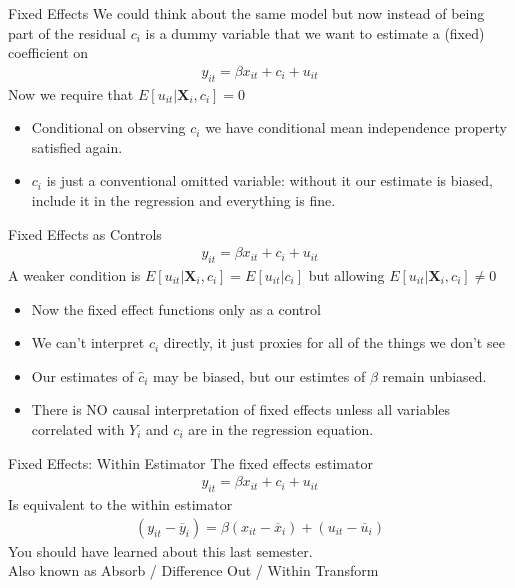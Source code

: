 \begin{frame}{Fixed Effects}
We could think about the same model but now instead of being part of the \alert{residual} $c_i$ is a dummy variable that we want to estimate a (fixed) coefficient on
\begin{align*}
y_{it} = \beta x_{it} + c_i + u_{it}
\end{align*}
Now we require that $E[u_{it}| \mathbf{X}_i , c_i] = 0$
\begin{itemize}
    \item Conditional on observing $c_i$ we have conditional mean independence property satisfied again.
    \item $c_i$ is just a conventional omitted variable: without it our estimate is \alert{biased}, include it in the regression and everything is fine.
\end{itemize}
\end{frame}


\begin{frame}{Fixed Effects as Controls}
\begin{align*}
y_{it} = \beta x_{it} + c_i + u_{it}
\end{align*}
A weaker condition is $E[u_{it}| \mathbf{X}_i , c_i] = E[u_{it}| c_i]$ but allowing $E[u_{it}| \mathbf{X}_i , c_i]\neq 0$
\begin{itemize}
\item Now the fixed effect functions only as a \alert{control}
\item We can't interpret $c_i$ directly, it just proxies for all of the things we don't see
\item Our estimates of $\hat{c}_i$ may be biased, but our estimtes of $\beta$ remain \alert{unbiased}.
\item There is \alert{NO} causal interpretation of fixed effects unless \alert{all variables} correlated with $Y_i$ and $c_i$ are in the regression equation.
\end{itemize}
\end{frame}

\begin{frame}{Fixed Effects: Within Estimator}
The fixed effects estimator
\begin{align*}
y_{it} = \beta x_{it} + c_i + u_{it}
\end{align*}
Is equivalent to the \alert{within estimator} 
\begin{align*}
(y_{it} - \overline{y}_i) = \beta (x_{it} - \overline{x}_i) + (u_{it} - \overline{u}_i)
\end{align*}
You should have learned about this last semester.\\
Also known as \alert{Absorb} / \alert{ Difference Out} / \alert{ Within Transform}
\end{frame}

